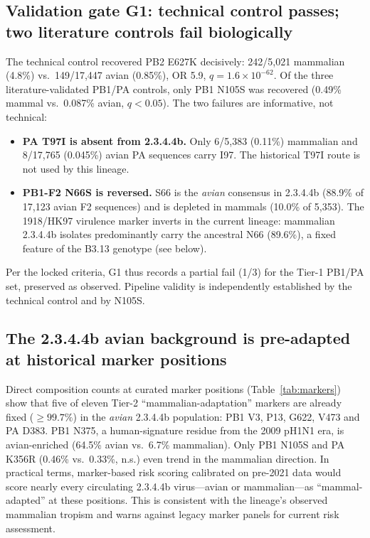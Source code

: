 \documentclass[11pt]{article}
\begin{document}
\subsection{Validation gate G1: technical control passes; two literature controls fail biologically}
The technical control recovered PB2 E627K decisively: 242/5,021 mammalian (4.8\%) vs.\ 149/17,447 avian (0.85\%), OR 5.9, $q=1.6\times10^{-62}$. Of the three literature-validated PB1/PA controls, only PB1 N105S was recovered (0.49\% mammal vs.\ 0.087\% avian, $q<0.05$). The two failures are informative, not technical:
\begin{itemize}
\item \textbf{PA T97I is absent from 2.3.4.4b.} Only 6/5,383 (0.11\%) mammalian and 8/17,765 (0.045\%) avian PA sequences carry I97. The historical T97I route is not used by this lineage.
\item \textbf{PB1-F2 N66S is reversed.} S66 is the \emph{avian} consensus in 2.3.4.4b (88.9\% of 17,123 avian F2 sequences) and is depleted in mammals (10.0\% of 5,353). The 1918/HK97 virulence marker inverts in the current lineage: mammalian 2.3.4.4b isolates predominantly carry the ancestral N66 (89.6\%), a fixed feature of the B3.13 genotype (see below).
\end{itemize}
Per the locked criteria, G1 thus records a partial fail (1/3) for the Tier-1 PB1/PA set, preserved as observed. Pipeline validity is independently established by the technical control and by N105S.

\subsection{The 2.3.4.4b avian background is pre-adapted at historical marker positions}
Direct composition counts at curated marker positions (Table~\ref{tab:markers}) show that five of eleven Tier-2 ``mammalian-adaptation'' markers are already fixed ($\geq99.7\%$) in the \emph{avian} 2.3.4.4b population: PB1 V3, P13, G622, V473 and PA D383. PB1 N375, a human-signature residue from the 2009 pH1N1 era, is avian-enriched (64.5\% avian vs.\ 6.7\% mammalian). Only PB1 N105S and PA K356R (0.46\% vs.\ 0.33\%, n.s.) even trend in the mammalian direction. In practical terms, marker-based risk scoring calibrated on pre-2021 data would score nearly every circulating 2.3.4.4b virus---avian or mammalian---as ``mammal-adapted'' at these positions. This is consistent with the lineage's observed mammalian tropism and warns against legacy marker panels for current risk assessment.
\end{document}
